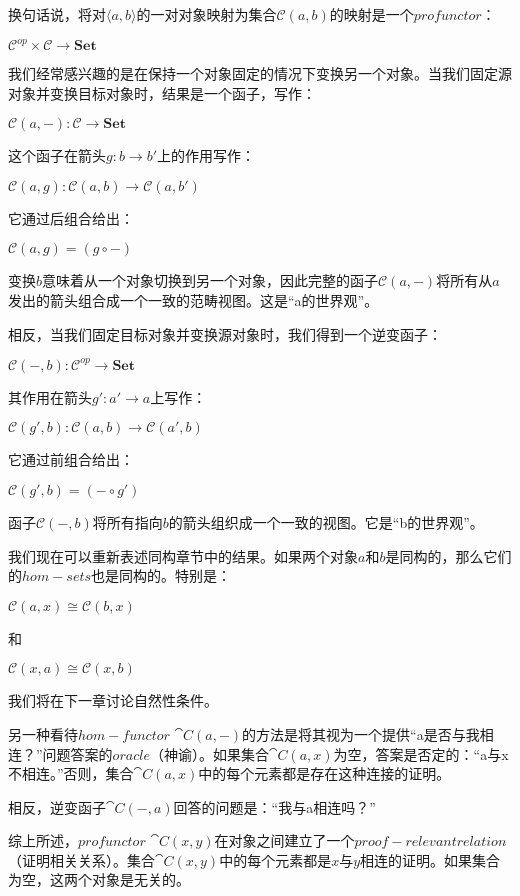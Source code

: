 \documentclass[DaoFP]{subfiles}
\begin{document}
    换句话说，将对$\langle a, b \rangle$的一对对象映射为集合$\mathcal{C}(a, b)$的映射是一个$profunctor$：

    $\mathcal{C}^{op} \times \mathcal{C} \to \mathbf{Set}$

    我们经常感兴趣的是在保持一个对象固定的情况下变换另一个对象。当我们固定源对象并变换目标对象时，结果是一个函子，写作：

    $\mathcal{C}(a, -) \colon \mathcal{C} \to \mathbf{Set}$

    这个函子在箭头$g \colon b \to b'$上的作用写作：

    $\mathcal{C}(a, g) \colon \mathcal{C}(a, b) \to \mathcal{C}(a, b')$

    它通过后组合给出：

    $\mathcal{C}(a, g) = (g \circ -)$

    变换$b$意味着从一个对象切换到另一个对象，因此完整的函子$\mathcal{C}(a, -)$将所有从$a$发出的箭头组合成一个一致的范畴视图。这是“a的世界观”。

    相反，当我们固定目标对象并变换源对象时，我们得到一个逆变函子：

    $\mathcal{C}(-, b) \colon \mathcal{C}^{op} \to \mathbf{Set}$

    其作用在箭头$g' \colon a' \to a$上写作：

    $\mathcal{C}(g', b) \colon \mathcal{C}(a, b) \to \mathcal{C}(a', b)$

    它通过前组合给出：

    $\mathcal{C}(g', b) = (- \circ g')$

    函子$\mathcal{C}(-, b)$将所有指向$b$的箭头组织成一个一致的视图。它是“b的世界观”。

    我们现在可以重新表述同构章节中的结果。如果两个对象$a$和$b$是同构的，那么它们的$hom-sets$也是同构的。特别是：

    $\mathcal{C}(a, x) \cong \mathcal{C}(b, x)$

    和

    $\mathcal{C}(x, a) \cong \mathcal{C}(x, b)$

    我们将在下一章讨论自然性条件。

    另一种看待$hom-functor$ $\cat C(a, -)$的方法是将其视为一个提供“a是否与我相连？”问题答案的$oracle$（神谕）。如果集合$\cat C(a, x)$为空，答案是否定的：“a与x不相连。”否则，集合$\cat C(a, x)$中的每个元素都是存在这种连接的证明。

    相反，逆变函子$\cat C (-, a)$回答的问题是：“我与a相连吗？”

    综上所述，$profunctor$ $\cat C(x, y)$在对象之间建立了一个$proof-relevant relation$（证明相关关系）。集合$\cat C(x, y)$中的每个元素都是$x$与$y$相连的证明。如果集合为空，这两个对象是无关的。
\end{document}
